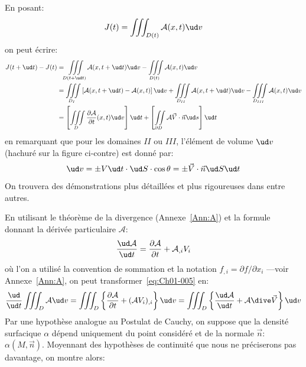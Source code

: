 \noindent En posant:
\begin{equation*}
J(t)=\iiint_{D(t)} \mathcal{A}(x,t) \ud v
\end{equation*} on peut écrire:
\begin{equation*}
    \begin{aligned}
        J(t+\ud t)-J(t) & =\iiint\limits_{D(t+\ud t)} \mathcal{A}(x,t+\ud t) \ud v-\iiint\limits_{D(t)} \mathcal{A}(x,t) \ud v\\
                        & =\iiint\limits_{D_I} \left[\mathcal{A}(x,t+\ud t)-\mathcal{A}(x,t)\right] \ud v+\iiint\limits_{D_{II}} \mathcal{A}(x,t+\ud t) \ud v-\iiint\limits_{D_{III}} \mathcal{A}(x,t) \ud v\\
                        & =\left[\iiint\limits_{D} \frac{\partial \mathcal{A}}{\partial t}(x,t) \ud v\right]\ud t+ \left[\iint\limits_{\partial D} \mathcal{A}\vec{V}\cdot\vec{n} \ud s\right]\ud t
    \end{aligned}
\end{equation*}
en remarquant que pour les domaines $II$ ou $III$, l'élément de volume $\ud v$ (hachuré sur la figure ci-contre) est donné par:
\begin{equation*}
    \ud v=\pm V \ud t \cdot \ud S \cdot \cos\theta = \pm \vec{V}\cdot\vec{n} \ud S \ud t
\end{equation*}
On trouvera des démonstrations plus détaillées et plus rigoureuses dans \cite{Germain-62,Germain-73,Mandel-66,Gontier-69} entre autres.

En utilisant le théorème de la divergence (Annexe~\ref{Ann:A}) et la formule donnant la dérivée particulaire $\mathcal{A}$:
\begin{equation*}
    \frac{\ud \mathcal{A}}{\ud t}=\frac{\partial \mathcal{A}}{\partial t}+\mathcal{A}_{,i}V_i
\end{equation*}
où l'on a utilisé la convention de sommation et la notation $f_{,i}=\partial f/\partial x_i$ ---voir Annexe~\ref{Ann:A}, on peut transformer~\eqref{eq:Ch01-005} en:
\begin{equation}
    \frac{\ud}{\ud t}\iiint_{D} \mathcal{A} \ud v=\iiint_{D}\left\{\frac{\partial\mathcal{A}}{\partial t}+(\mathcal{A}V_i)_{,i}\right\} \ud v=\iiint_{D} \left\{\frac{\ud\mathcal{A}}{\ud t}+\mathcal{A}\dive\vec{V}\right\} \ud v
    \label{eq:Ch01-006}
\end{equation}
Par une hypothèse analogue au Postulat de Cauchy, on suppose que la densité surfacique $\alpha$ dépend uniquement du point considéré et de la normale $\vec{n}$: $\alpha(M,\vec{n})$.
Moyennant des hypothèses de continuité que nous ne préciserons pas davantage, on montre alors:

